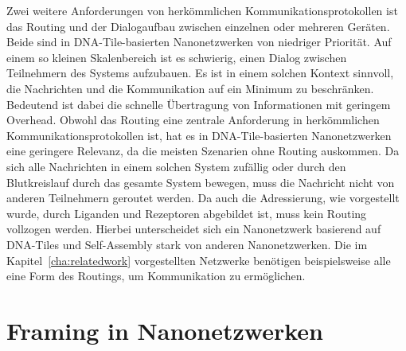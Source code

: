 Zwei weitere Anforderungen von herkömmlichen Kommunikationsprotokollen ist das Routing und der Dialogaufbau zwischen einzelnen oder mehreren Geräten. Beide sind in DNA-Tile-basierten Nanonetzwerken von niedriger Priorität. Auf einem so kleinen Skalenbereich ist es schwierig, einen Dialog zwischen Teilnehmern des Systems aufzubauen. Es ist in einem solchen Kontext sinnvoll, die Nachrichten und die Kommunikation auf ein Minimum zu beschränken. Bedeutend ist dabei die schnelle Übertragung von Informationen mit geringem Overhead. Obwohl das Routing eine zentrale Anforderung in herkömmlichen Kommunikationsprotokollen ist, hat es in DNA-Tile-basierten Nanonetzwerken eine geringere Relevanz, da die meisten Szenarien ohne Routing auskommen. Da sich alle Nachrichten in einem solchen System zufällig oder durch den Blutkreislauf durch das gesamte System bewegen, muss die Nachricht nicht von anderen Teilnehmern geroutet werden. Da auch die Adressierung, wie vorgestellt wurde, durch Liganden und Rezeptoren abgebildet ist, muss kein Routing vollzogen werden. Hierbei unterscheidet sich ein Nanonetzwerk basierend auf DNA-Tiles und Self-Assembly stark von anderen Nanonetzwerken. Die im Kapitel~\ref{cha:relatedwork} vorgestellten Netzwerke benötigen beispielsweise alle eine Form des Routings, um Kommunikation zu ermöglichen. 

\section{Framing in Nanonetzwerken}

